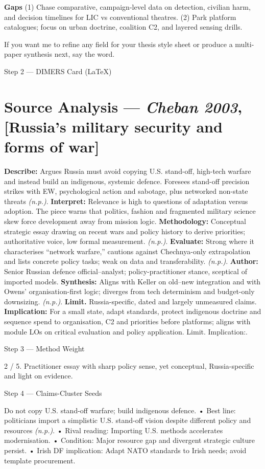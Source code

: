 \textbf{Gaps}
(1) Chase comparative, campaign-level data on detection, civilian harm, and decision timelines for LIC vs conventional theatres.
(2) Park platform catalogues; focus on urban doctrine, coalition C2, and layered sensing drills.

If you want me to refine any field for your thesis style sheet or produce a multi-paper synthesis next, say the word.

\parencite{CHEBAN_2003}
Step 2 — DIMERS Card (LaTeX)

\section*{Source Analysis — \textit{Cheban 2003}, [Russia’s military security and forms of war]}
\textbf{Describe:} Argues Russia must avoid copying U.S. stand-off, high-tech warfare and instead build an indigenous, systemic defence. Foresees stand-off precision strikes with EW, psychological action and sabotage, plus networked non-state threats \emph{(n.p.)}.
\textbf{Interpret:} Relevance is high to questions of adaptation versus adoption. The piece warns that politics, fashion and fragmented military science skew force development away from mission logic.
\textbf{Methodology:} Conceptual strategic essay drawing on recent wars and policy history to derive priorities; authoritative voice, low formal measurement. \emph{(n.p.)}.
\textbf{Evaluate:} Strong where it characterises “network warfare,” cautions against Chechnya-only extrapolation and lists concrete policy tasks; weak on data and transferability. \emph{(n.p.)}.
\textbf{Author:} Senior Russian defence official–analyst; policy-practitioner stance, sceptical of imported models.
\textbf{Synthesis:} Aligns with Keller on old–new integration and with Owens’ organisation-first logic; diverges from tech determinism and budget-only downsizing. \emph{(n.p.)}.
\textbf{Limit.} Russia-specific, dated and largely unmeasured claims. \textbf{Implication:} For a small state, adapt standards, protect indigenous doctrine and sequence spend to organisation, C2 and priorities before platforms; aligns with module LOs on critical evaluation and policy application. Limit. Implication:.

Step 3 — Method Weight

2 / 5. Practitioner essay with sharp policy sense, yet conceptual, Russia-specific and light on evidence.

Step 4 — Claims-Cluster Seeds

Do not copy U.S. stand-off warfare; build indigenous defence.
• Best line: politicians import a simplistic U.S. stand-off vision despite different policy and resources \emph{(n.p.)}.
• Rival reading: Importing U.S. methods accelerates modernisation.
• Condition: Major resource gap and divergent strategic culture persist.
• Irish DF implication: Adapt NATO standards to Irish needs; avoid template procurement.

